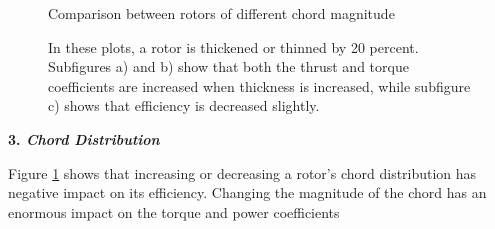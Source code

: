 \documentclass{article}
\begin{document}
\begin{figure}
  \centering
  \caption{Comparison between rotors of different chord magnitude}
  \captionsetup{aboveskip=0pt,font=it}
  \caption*{In these plots, a rotor is thickened or thinned by 20 percent. Subfigures a) and b) show that both the thrust and torque coefficients are increased when thickness is increased, while subfigure c) shows that efficiency is decreased slightly.}
  \label{fig:5}
\end{figure}

\textbf{3. \emph{Chord Distribution}} \newline

Figure \ref{fig:5} shows that increasing or decreasing a rotor's chord distribution has negative impact on its efficiency. Changing the magnitude of the chord has an enormous impact on the torque and power coefficients
\end{document}
